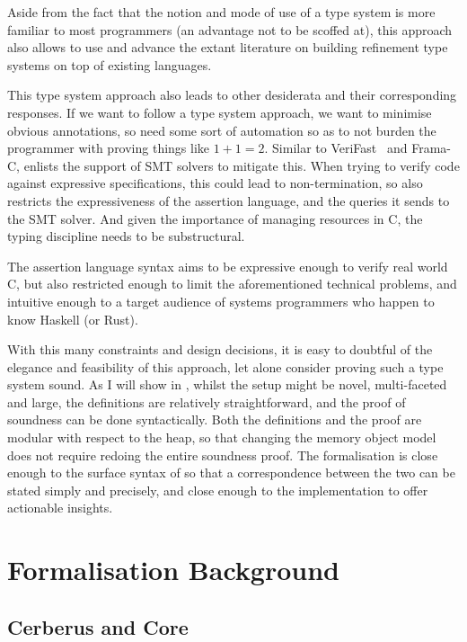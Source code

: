 Aside from the fact that the notion and mode of use of a type system is more
familiar to most programmers (an advantage not to be scoffed at), this approach
also allows  to use and advance the extant literature on building
refinement type systems on top of existing languages.

This type system approach also leads to other desiderata and their
corresponding responses. If we want to follow a type system approach, we want
to minimise obvious annotations, so need some sort of automation so as to not
burden the programmer with proving things like $1 + 1 = 2$. Similar to
VeriFast~ and Frama-C,
 enlists the support of SMT solvers to mitigate this. When trying to
verify code against expressive specifications, this could lead to
non-termination, so  also restricts the expressiveness of the assertion
language, and the queries it sends to the SMT solver. And given the importance
of managing resources in C, the typing discipline needs to be substructural.

The  assertion language syntax aims to be expressive enough to verify
real world C, but also restricted enough to limit the aforementioned technical
problems, and intuitive enough to a target audience of systems programmers who
happen to know Haskell (or Rust).

With this many constraints and design decisions, it is easy to doubtful of the
elegance and feasibility of this approach, let alone consider proving such a
type system sound. As I will show in , whilst the setup
might be novel, multi-faceted and large, the definitions are relatively
straightforward, and the proof of soundness can be done syntactically. Both the
definitions and the proof are modular with respect to the heap, so that
changing the memory object model does not require redoing the entire soundness
proof. The formalisation is close enough to the surface syntax of  so
that a correspondence between the two can be stated simply and precisely, and
close enough to the implementation to offer actionable insights.

\chapter{Formalisation Background}%
\label{chap:formal-background}

\section{Cerberus and Core}%
\label{sec:cerberus-core}

